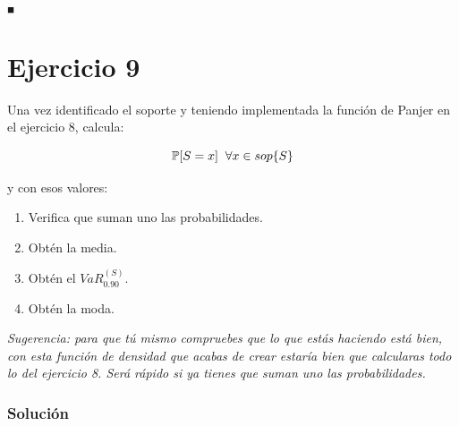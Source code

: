 \documentclass[
]{article}
\begin{document}
\(_\blacksquare\)

\hypertarget{ejercicio-9}{%
\section{Ejercicio 9}\label{ejercicio-9}}

Una vez identificado el soporte y teniendo implementada la función de
Panjer en el ejercicio 8, calcula:

\vspace{-0.3cm}

\[
\mathbb{P}[S=x] \hspace{0.2cm} \forall x\in sop\{S\}
\]

\vspace{-0.3cm}

y con esos valores:

\begin{enumerate}[label=(\alph*)]
\item Verifica que suman uno las probabilidades.
\item Obtén la media.
\item Obtén el $VaR_{0.90}^{(S)}$.
\item Obtén la moda.
\end{enumerate}

\emph{Sugerencia: para que tú mismo compruebes que lo que estás haciendo
está bien, con esta función de densidad que acabas de crear estaría bien
que calcularas todo lo del ejercicio 8. Será rápido si ya tienes que
suman uno las probabilidades.}

\hypertarget{soluciuxf3n-8}{%
\subsubsection{Solución}\label{soluciuxf3n-8}}
\end{document}
